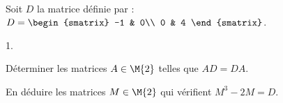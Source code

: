 \documentclass[11pt]{article}%
\begin{document}
\begin{exerciceSP}~\\
  Soit $D$ la matrice définie par : $D = 
  \begin{smatrix} 
    -1 & 0\\ 
    0 & 4
  \end{smatrix}$.
  \begin{noliste}{1.}
    \setlength{\itemsep}{2mm}
  \item Déterminer les matrices $A\in\M{2}$ telles que $AD=DA$.
  \item En déduire les matrices $M\in\M{2}$ qui vérifient $M^3-2M=D$.
  \end{noliste}
\end{exerciceSP}




\end{document}
